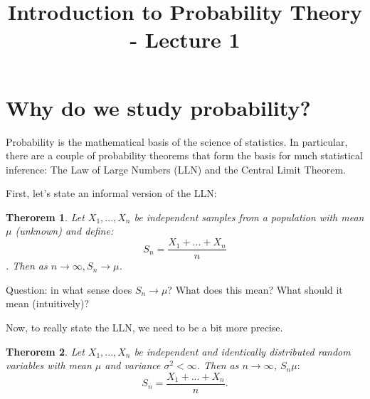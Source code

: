\documentclass[12pt]{article} %
\title{Introduction to Probability Theory - Lecture 1}
\newtheorem{thm}{Therorem}
\begin{document}
\maketitle
\section{Why do we study probability?}
Probability is the mathematical basis of the science of statistics. In particular, there are a couple of probability theorems that form the basis for much statistical inference: The Law of Large Numbers (LLN) and the Central Limit Theorem.

First, let's state an informal version of the LLN:

\begin{thm}
Let $X_1,...,X_n$ be independent samples from a population with mean $\mu$ (unknown) and define:
$$S_n = \frac{X_1+...+X_n}n$$.
Then as $n\rightarrow\infty, S_n\rightarrow\mu$.
\end{thm}
Question: in what sense does $S_n\rightarrow\mu$? What does this mean? What should it mean (intuitively)? 

Now, to really state the LLN, we need to be a bit more precise. 
\begin{thm}
Let $X_1,...,X_n$ be independent and identically distributed random variables with mean $\mu$ and variance $\sigma^2<\infty$. Then as $n\rightarrow\infty$, $S_n\mu:$
$$S_n=\frac{X_1+...+X_n}{n}.$$
\end{thm}
\end{document}
